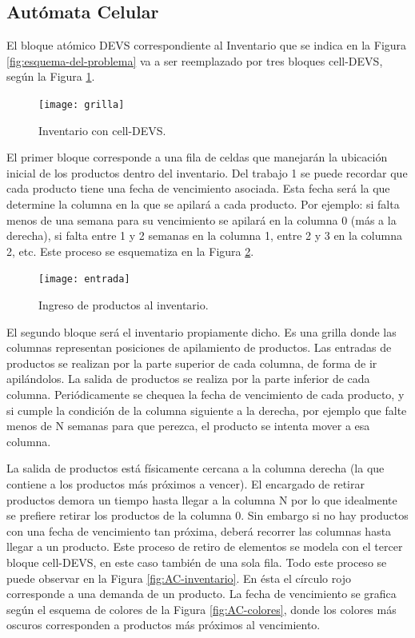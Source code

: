 \documentclass[10pt]{article}
\begin{document}
\subsection{Autómata Celular\label{sec:AC}} 

 El bloque atómico DEVS correspondiente al Inventario que se indica en la Figura \ref{fig:esquema-del-problema} va a ser reemplazado por tres bloques cell-DEVS, según la Figura \ref{fig:AC-esquematico}.
 
 \begin{figure}[h] 
 	\centering
 	\texttt{[image: grilla]} 
 	\caption{Inventario con cell-DEVS.} 
 	\label{fig:AC-esquematico} 
 \end{figure}
 \FloatBarrier
 
 El primer bloque corresponde a una fila de celdas que manejarán la ubicación inicial de los productos dentro del inventario. Del trabajo 1 se puede recordar que cada producto tiene una fecha de vencimiento asociada. Esta fecha será la que determine la columna en la que se apilará a cada producto. Por ejemplo: si falta menos de una semana para su vencimiento se apilará en la columna 0 (más a la derecha), si falta entre 1 y 2 semanas en la columna 1, entre 2 y 3 en la columna 2, etc. Este proceso se esquematiza en la Figura \ref{fig:AC-ingreso-de-productos}.
 
 \begin{figure}[h] 
 	\centering 
 	\texttt{[image: entrada]} 
 	\caption{Ingreso de productos al inventario.} 
 	\label{fig:AC-ingreso-de-productos} 
 \end{figure}
 \FloatBarrier
 
 El segundo bloque será el inventario propiamente dicho. Es una grilla donde las columnas representan posiciones de apilamiento de productos. Las entradas de productos se realizan por la parte superior de cada columna, de forma de ir apilándolos. La salida de productos se realiza por la parte inferior de cada columna. Periódicamente se chequea la fecha de vencimiento de cada producto, y si cumple la condición de la columna siguiente a la derecha, por ejemplo que falte menos de N semanas para que perezca, el producto se intenta mover a esa columna.
 
 La salida de productos está físicamente cercana a la columna derecha (la que contiene a los productos más próximos a vencer). El encargado de retirar productos demora un tiempo hasta llegar a la columna N por lo que idealmente se prefiere retirar los productos de la columna 0. Sin embargo si no hay productos con una fecha de vencimiento tan próxima, deberá recorrer las columnas hasta llegar a un producto. Este proceso de retiro de elementos se modela con el tercer bloque cell-DEVS, en este caso también de una sola fila.
 Todo este proceso se puede observar en la Figura \ref{fig:AC-inventario}. En ésta el círculo rojo corresponde a una demanda de un producto. La fecha de vencimiento se grafica según el esquema de colores de la Figura \ref{fig:AC-colores}, donde los colores más oscuros corresponden a productos más próximos al vencimiento.
 
\end{document}
